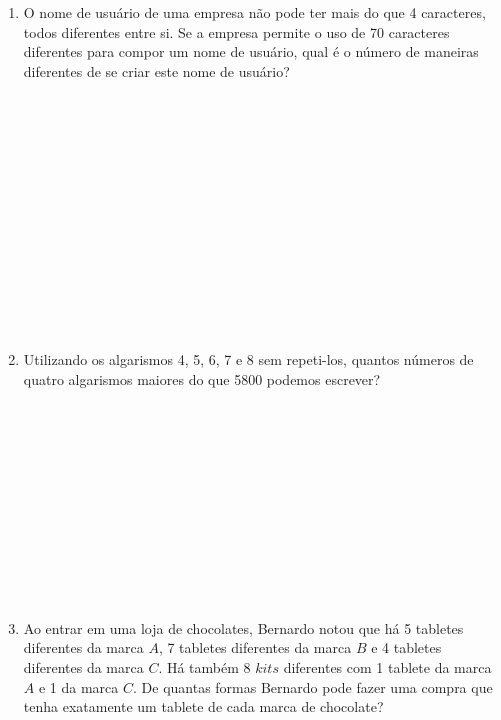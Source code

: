 \documentclass[a4paper,14pt]{article}
\begin{document}
\begin{multicols}{2}
\begin{enumerate}
			\item O nome de usuário de uma empresa não pode ter mais do que 4 caracteres, todos diferentes entre si. Se a empresa permite o uso de 70 caracteres diferentes para compor um nome de usuário, qual é o número de maneiras diferentes de se criar este nome de usuário? \\\\\\\\\\\\\\\\\\\\\\\\\\\\
			\item Utilizando os algarismos 4, 5, 6, 7 e 8 sem repeti-los, quantos números de quatro algarismos maiores do que 5800 podemos escrever? \\\\\\\\\\\\\\\\\\\\\\\\
			\item Ao entrar em uma loja de chocolates, Bernardo notou que há 5 tabletes diferentes da marca $A$, 7 tabletes diferentes da marca $B$ e 4 tabletes diferentes da marca $C$. Há também 8 $kits$ diferentes com 1 tablete da marca $A$ e 1 da marca $C$. De quantas formas Bernardo pode fazer uma compra que tenha exatamente um tablete de cada marca de chocolate? \\\\\\\\\\\\\\\\\\\\\\\\\\\\
        \end{enumerate}

\end{multicols}
\end{document}
